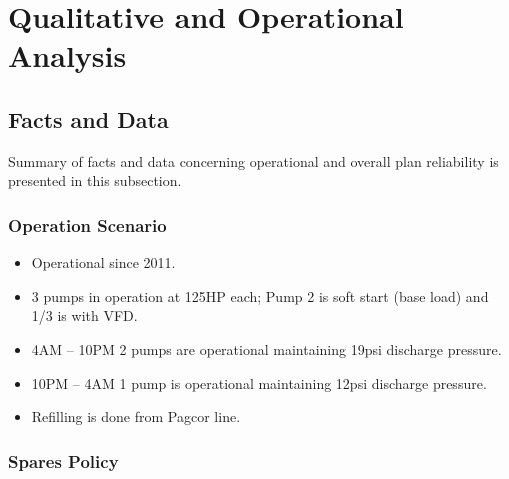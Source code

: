 %
\section{Qualitative and Operational Analysis}
\label{42}
\subsection{Facts and Data}

Summary of facts and data concerning operational and overall plan reliability is presented in this subsection.

\subsubsection{Operation Scenario}

\begin{itemize}
	\item Operational since 2011.
	
	\item 3 pumps in operation at 125HP each; Pump 2 is soft start (base load) and 1/3 is with VFD.
	
	\item 4AM – 10PM 2 pumps are operational maintaining 19psi discharge pressure.
	
	\item 10PM – 4AM 1 pump is operational maintaining 12psi discharge pressure.
	
	\item Refilling is done from Pagcor line.
\end{itemize}

%
%	
%
%
%	
%

\subsubsection{Spares Policy}

